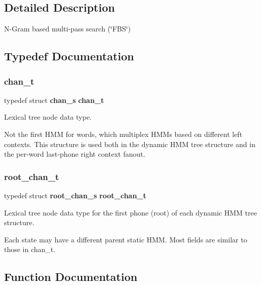 \subsection{Detailed Description}
N-\/\+Gram based multi-\/pass search (\char`\"{}\+F\+B\+S\char`\"{}) 



\subsection{Typedef Documentation}
\mbox{\label{ngram__search_8h_a2c5740fe4792d870b73f4100b32e9324}} 
\subsubsection{chan\+\_\+t}
{\footnotesize\ttfamily typedef struct \textbf{ chan\+\_\+s}  \textbf{ chan\+\_\+t}}



Lexical tree node data type. 

Not the first H\+MM for words, which multiplex H\+M\+Ms based on different left contexts. This structure is used both in the dynamic H\+MM tree structure and in the per-\/word last-\/phone right context fanout. \mbox{\label{ngram__search_8h_aab8eee3f73f666d0e12c5b355a651cff}} 
\subsubsection{root\+\_\+chan\+\_\+t}
{\footnotesize\ttfamily typedef struct \textbf{ root\+\_\+chan\+\_\+s}  \textbf{ root\+\_\+chan\+\_\+t}}



Lexical tree node data type for the first phone (root) of each dynamic H\+MM tree structure. 

Each state may have a different parent static H\+MM. Most fields are similar to those in chan\+\_\+t. 

\subsection{Function Documentation}
\mbox{\label{ngram__search_8h_aee393a136f8f7e8b98161e6eed7b1dd9}} 
